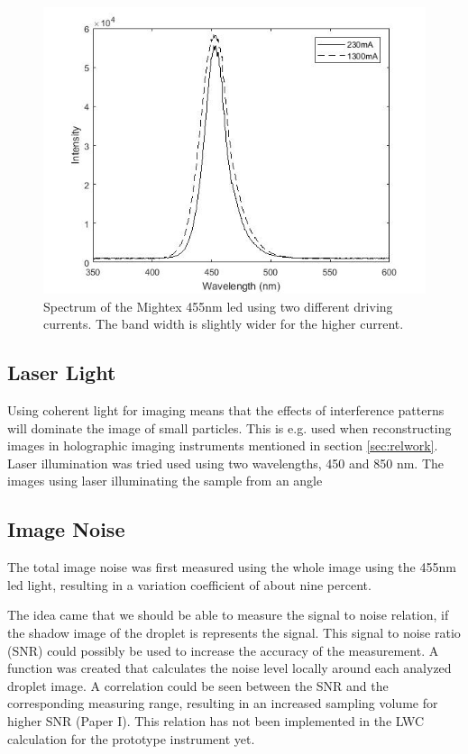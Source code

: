 \begin{figure}%
\centering\includegraphics[width=0.6\linewidth]{figures/spektralanalys_mightex455nm}
\caption{Spectrum of the Mightex 455nm \gls{led} using two different driving currents. The band width is slightly wider for the higher current.}
\label{fig:ledspectrum}
\end{figure}

\subsection{Laser Light}

Using coherent light for imaging means that the effects of interference patterns will dominate the image of small particles. This is e.g. used when reconstructing images in holographic imaging instruments mentioned in section \ref{sec:relwork}. Laser illumination was tried used using two wavelengths, 450 and 850 nm. The images using laser illuminating the sample from an angle 

\subsection{Image Noise}

The total image noise was first measured using the whole image using the 455nm \gls{led} light, resulting in a variation coefficient of about nine percent.

The idea came that we should be able to measure the signal to noise relation, if the shadow image of the droplet is represents the signal. This signal to noise ratio (SNR) could possibly be used to increase the accuracy of the measurement. A function was created that calculates the noise level locally around each analyzed droplet image. A correlation could be seen between the SNR and the corresponding measuring range, resulting in an increased sampling volume for higher SNR \cite{ryd2015}(Paper I). This relation has not been implemented in the LWC calculation for the prototype instrument yet.

